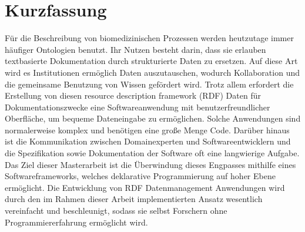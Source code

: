 \chapter*{Kurzfassung}

Für die Beschreibung von biomedizinischen Prozessen werden heutzutage immer häufiger Ontologien benutzt. Ihr Nutzen besteht darin, dass sie erlauben textbasierte Dokumentation durch strukturierte Daten zu ersetzen. Auf diese Art wird es Institutionen ermöglich Daten auszutauschen, wodurch Kollaboration und die gemeinsame Benutzung von Wissen gefördert wird. Trotz allem erfordert die Erstellung von diesen resource description framework (RDF) Daten für Dokumentationszwecke eine Softwareanwendung mit benutzerfreundlicher Oberfläche, um bequeme Dateneingabe zu ermöglichen. Solche Anwendungen sind normalerweise komplex und benötigen eine große Menge Code. Darüber hinaus ist die Kommunikation zwischen Domainexperten und Softwareentwicklern und die Spezifikation sowie Dokumentation der Software oft eine langwierige Aufgabe. Das Ziel dieser Masterarbeit ist die Überwindung dieses Engpasses mithilfe eines Softwareframeworks, welches deklarative Programmierung auf hoher Ebene ermöglicht. Die Entwicklung von RDF Datenmanagement Anwendungen wird durch den im Rahmen dieser Arbeit implementierten Ansatz wesentlich vereinfacht und beschleunigt, sodass sie selbst Forschern ohne Programmiererfahrung ermöglicht wird.

\linespread{1.25}\selectfont

\tableofcontents %
\listoffigures  %
\blankpage
\blankpage






%

\blankpage


